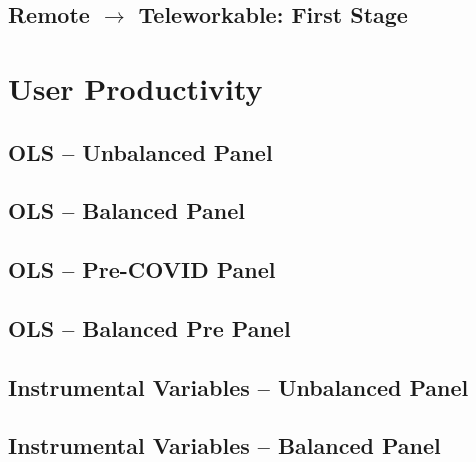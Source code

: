 \documentclass{article}
\newcommand{\cleanedresultsdir}{../results/cleaned}
\begin{document}
\subsection{Remote $\rightarrow$ Teleworkable: First Stage}



\clearpage
\section{User Productivity}
\label{sec:user_productivity}

\subsection{OLS -- Unbalanced Panel}


\subsection{OLS -- Balanced Panel}


\subsection{OLS -- Pre-COVID Panel}

\subsection{OLS -- Balanced Pre Panel}


\subsection{Instrumental Variables -- Unbalanced Panel}


\subsection{Instrumental Variables -- Balanced Panel}

\end{document}
